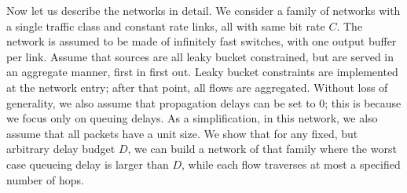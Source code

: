 Now let us describe the networks in detail. We consider a family
of networks with a single traffic class and constant rate links,
all with same bit rate $C$. The network is assumed to be made of
infinitely fast switches, with one output buffer per link. Assume
that sources are all leaky bucket constrained, but are served in
an aggregate manner, first in first out. Leaky bucket constraints
are implemented at the network entry; after that point, all flows
are aggregated. Without loss of generality, we also assume that
propagation delays can be set to 0; this is because we focus only
on queuing delays. As a simplification, in this network, we also
assume that all packets have a unit size. We show that for any
fixed, but arbitrary delay budget $D$, we can build a network of
that family where the worst case queueing delay is larger than
$D$, while each flow traverses at most a specified number of hops.

